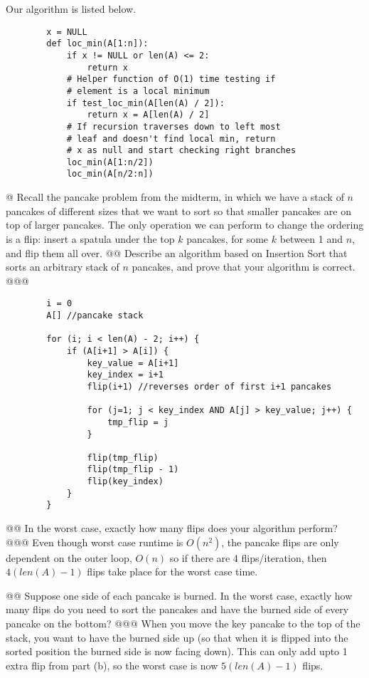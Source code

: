 \documentclass[10pt]{article}
\begin{document}
\begin{easylist}[enumerate]
    Our algorithm is listed below.
    \lstset{language=Python}
    \begin{lstlisting}
        x = NULL
        def loc_min(A[1:n]):
            if x != NULL or len(A) <= 2:
                return x
            # Helper function of O(1) time testing if
            # element is a local minimum
            if test_loc_min(A[len(A) / 2]):
                return x = A[len(A) / 2]
            # If recursion traverses down to left most
            # leaf and doesn't find local min, return
            # x as null and start checking right branches
            loc_min(A[1:n/2])
            loc_min(A[n/2:n])
    \end{lstlisting}

    @ Recall the pancake problem from the midterm, in which we have a stack of $n$ pancakes of different sizes that we
    want to sort so that smaller pancakes are on top of larger pancakes. The only operation we can perform to change the
    ordering is a flip: insert a spatula under the top $k$ pancakes, for some $k$ between 1 and $n$, and flip them all
    over.
    @@ Describe an algorithm based on Insertion Sort that sorts an arbitrary stack of $n$ pancakes, and prove that your
    algorithm is correct.
    @@@ 
    \begin{lstlisting}
        i = 0
        A[] //pancake stack

        for (i; i < len(A) - 2; i++) {
            if (A[i+1] > A[i]) {
                key_value = A[i+1]
                key_index = i+1
                flip(i+1) //reverses order of first i+1 pancakes

                for (j=1; j < key_index AND A[j] > key_value; j++) {
                    tmp_flip = j
                }

                flip(tmp_flip)
                flip(tmp_flip - 1)
                flip(key_index)
            }
        }
    \end{lstlisting}

    @@ In the worst case, exactly how many flips does your algorithm perform?
    @@@ Even though worst case runtime is $O(n^2)$, the pancake flips are only dependent on the outer loop, $O(n)$ so if
    there are 4 flips/iteration, then $4(len(A) - 1)$ flips take place for the worst case time.

    @@ Suppose one side of each pancake is burned. In the worst case, exactly how many flips do you need to sort the
    pancakes and have the burned side of every pancake on the bottom?
    @@@ When you move the key pancake to the top of the stack, you want to have the burned side up (so that when it is
    flipped into the sorted position the burned side is now facing down). This can only add upto 1 extra flip from part
    (b), so the worst case is now $5 (len(A) - 1)$ flips.
\end{easylist}
\end{document}
